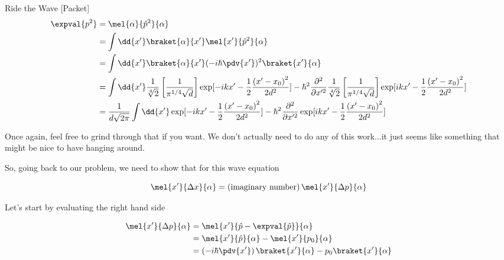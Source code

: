\begin{answer}
\begin{answerpart}{Ride the Wave [Packet]}
    \begin{equation}
      \begin{split}
        \expval{p^2}
        &= \mel{\alpha}{\hat{p}^2}{\alpha}\\
        &= \int \dd{x'} \braket{\alpha}{x'} \mel{x'}{\hat{p}^2}{\alpha}\\
        &= \int \dd{x'} \braket{\alpha}{x'}
        (-i \hbar \pdv{x'})^2
        \braket{x'}{\alpha}\\
        &= \int \dd{x'}
        \frac{1}{\sqrt[4]{2}}
        \left[\frac{1}{\pi^{1/4}\sqrt{d}}\right]
        \exp[
          - ikx'
          - \frac{1}{2}\frac{\left(x' - x_0\right)^2}{2d^2}
        ]
        -\hbar^2\frac{\partial^2}{\partial x'^2}
        \frac{1}{\sqrt[4]{2}}
        \left[\frac{1}{\pi^{1/4}\sqrt{d}}\right]
        \exp[
          ikx'
          - \frac{1}{2}\frac{\left(x' - x_0\right)^2}{2d^2}
        ]\\
        &=
        \frac{1}{d\sqrt{2\pi}}
        \int \dd{x'}
        \exp[
          - ikx'
          - \frac{1}{2}\frac{\left(x' - x_0\right)^2}{2d^2}
        ]
        -\hbar^2\frac{\partial^2}{\partial x'^2}
        \exp[
          ikx'
          - \frac{1}{2}\frac{\left(x' - x_0\right)^2}{2d^2}
        ]\\
      \end{split}
    \end{equation}

    Once again, feel free to grind through that if you want.  We don't
    actually need to do any of this work...it just seems like
    something that might be nice to have hanging around.

    So, going back to our problem, we need to show that for this wave
    equation

    \begin{equation}
      \mel{x'}{\Delta x}{\alpha}
      = \left(\text{imaginary number}\right)
      \mel{x'}{\Delta p}{\alpha}
    \end{equation}

    Let's start by evaluating the right hand side

    \begin{equation}
      \begin{split}
        \mel{x'}{\Delta p}{\alpha}
        &= \mel{x'}{\hat{p} - \expval{\hat{p}}}{\alpha}\\
        &= \mel{x'}{\hat{p}}{\alpha} - \mel{x'}{p_0}{\alpha}\\
        &= \left(-i \hbar \pdv{x'}\right) \braket{x'}{\alpha}
        - p_0\braket{x'}{\alpha}\\
      \end{split}
    \end{equation}


\end{answerpart}
\end{answer}
